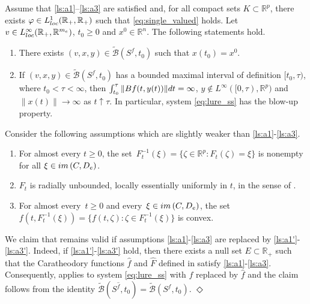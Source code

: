 \documentclass[10pt,a4paper]{amsart}
\newcommand{\R}{\mathbb R}
\newcommand{\sB}{{\mathcal B}}
\begin{document}
\begin{theorem}\label{thm:inclusion_wp}
Assume
that \ref{ls:a1}--\ref{ls:a3} are satisfied and, for all compact sets $K\subset\R^p$, there exists $\varphi\in L^1_{\rm loc}(\R_+,\R_+)$ such that \eqref{eq:single_valued} holds.
Let $v\in L^\infty_{\rm loc}(\R_+,\R^{m_{\rm e}})$, $t_0\geq 0$ and $x^0\in\R^n$. The following statements hold.
\begin{enumerate}[label = {\bf (\arabic*)}, ref={\rm (\arabic*)}, leftmargin = 0ex, itemindent = 4.6ex]
%
\item \label{ls:inclusion_wp_s_1} There exists $(v,x,y)\in\tilde\sB(S^f,t_0)$ such that $x(t_0)=x^0$.
%
\item \label{ls:inclusion_wp_s_2}
If $(v,x,y)\in\tilde\sB(S^f,t_0)$ has a bounded maximal interval of definition $[t_0,\tau)$,
where $t_0<\tau<\infty$, then $\int_{t_0}^\tau\|Bf(t,y(t))\|{\rm d}t=\infty$, $y\not\in L^\infty([0,\tau),\R^p)$ and $\|x(t)\|\to\infty$ as $t\uparrow\tau$. In particular,
system \eqref{eq:lure_ss} has the blow-up property.
%
\end{enumerate}
\end{theorem}

\begin{remark}\label{rem:a.e.'}
\begin{rm}
Consider the following assumptions which are slightly weaker than \ref{ls:a1}-\ref{ls:a3}.
\begin{enumerate}[label = {\bfseries (B\arabic*)}, ref = {\rm (B\arabic*)}]
%
\item \label{ls:a1'} For almost every $t\geq 0$, the set~$F_t^{-1}(\xi)=\{\zeta\in\R^p:F_t(\zeta)=\xi\}$ is nonempty for all $\xi\in{\rm im}\,(C,D_{\rm e})$.
%
\item \label{ls:a2'} $F_t$ is radially unbounded, locally essentially uniformly in $t$, in the sense of .
%
\item \label{ls:a3'} For almost every~$t\geq 0$ and every~$\xi\in {\rm im}\,(C,D_{\rm e})$, the set~$f(t,F_t^{-1}(\xi))=\{f(t,\zeta):\zeta\in F_t^{-1}(\xi)\}$ is convex.
\end{enumerate}
We claim that  remains valid if assumptions \ref{ls:a1}-\ref{ls:a3} are replaced by \ref{ls:a1'}-\ref{ls:a3'}. Indeed, if \ref{ls:a1'}-\ref{ls:a3'} hold, then
there exists a null set $E\subset\R_+$ such that the  Caratheodory functions $\hat f$ and $\hat F$ defined in  satisfy \ref{ls:a1}-\ref{ls:a3}. Consequently,  applies to system \eqref{eq:lure_ss} with $f$ replaced by $\hat f$
and the claim follows from the identity  $\tilde\sB(S^{\hat f},t_0)=
\tilde\sB(S^f,t_0)$.
\hfill$\Diamond$
\end{rm}
\end{remark}
\end{document}
